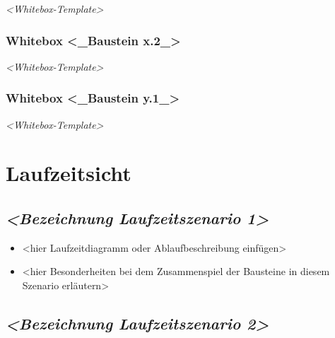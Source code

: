 \documentclass[
]{article}
\begin{document}
\emph{\textless Whitebox-Template\textgreater{}}

\hypertarget{_whitebox_baustein_x_2}{%
\subsubsection{Whitebox \textless\_Baustein
x.2\_\textgreater{}}\label{_whitebox_baustein_x_2}}

\emph{\textless Whitebox-Template\textgreater{}}

\hypertarget{_whitebox_baustein_y_1}{%
\subsubsection{Whitebox \textless\_Baustein
y.1\_\textgreater{}}\label{_whitebox_baustein_y_1}}

\emph{\textless Whitebox-Template\textgreater{}}

\hypertarget{section-runtime-view}{%
\section{Laufzeitsicht}\label{section-runtime-view}}

\hypertarget{__emphasis_bezeichnung_laufzeitszenario_1_emphasis}{%
\subsection{\texorpdfstring{\emph{\textless Bezeichnung Laufzeitszenario
1\textgreater{}}}{\textless Bezeichnung Laufzeitszenario 1\textgreater{}}}\label{__emphasis_bezeichnung_laufzeitszenario_1_emphasis}}

\begin{itemize}
\item
  \textless hier Laufzeitdiagramm oder Ablaufbeschreibung
  einfügen\textgreater{}
\item
  \textless hier Besonderheiten bei dem Zusammenspiel der Bausteine in
  diesem Szenario erläutern\textgreater{}
\end{itemize}

\hypertarget{__emphasis_bezeichnung_laufzeitszenario_2_emphasis}{%
\subsection{\texorpdfstring{\emph{\textless Bezeichnung Laufzeitszenario
2\textgreater{}}}{\textless Bezeichnung Laufzeitszenario 2\textgreater{}}}\label{__emphasis_bezeichnung_laufzeitszenario_2_emphasis}}
\end{document}
